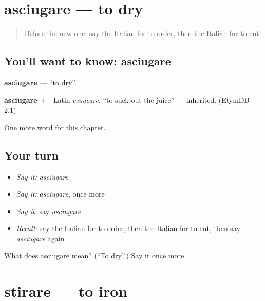 \section[asciugare]{asciugare — to dry}

\label{lesson:IT-C233-asciugare}



\begin{quote}
Before the new one: say the Italian for to order, then the Italian for to cut.
\end{quote}

\subsection*{You'll want to know: asciugare}
\textbf{asciugare} — \textquotedblleft{}to dry\textquotedblright{}.

\begin{cousinweb}
\textbf{asciugare} $\leftarrow$ Latin \emph{exsucare}, \textquotedblleft{}to suck out the juice\textquotedblright{} — inherited. (EtymDB 2.1)
\end{cousinweb}

\begin{grammarlens}[title={What you've built}]
One more word for this chapter.
\end{grammarlens}

\subsection*{Your turn}
\begin{itemize}
\raggedright
  \item \emph{Say it:} \emph{asciugare}
  \item \emph{Say it:} \emph{asciugare}, once more
  \item \emph{Say it:} say \emph{asciugare}
  \item \emph{Recall:} say the Italian for to order, then the Italian for to cut, then say \emph{asciugare} again
\end{itemize}

\begin{tcolorbox}[breakable,colback=teal!4,colframe=teal!35!black,title={Before you move on}]
What does asciugare mean? (\textquotedblleft{}To dry\textquotedblright{}.) Say it once more.
\end{tcolorbox}
\section[stirare]{stirare — to iron}

